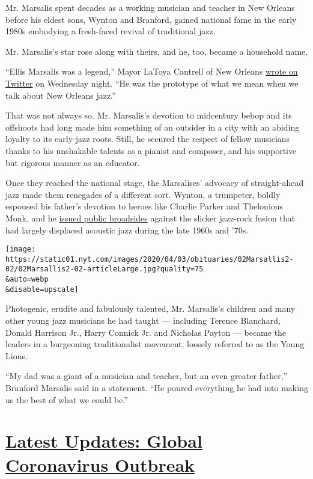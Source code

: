 Mr. Marsalis spent decades as a working musician and teacher in New
Orleans before his eldest sons, Wynton and Branford, gained national
fame in the early 1980s embodying a fresh-faced revival of traditional
jazz.

Mr. Marsalis's star rose along with theirs, and he, too, became a
household name.

``Ellis Marsalis was a legend,'' Mayor LaToya Cantrell of New Orleans
\href{https://twitter.com/mayorcantrell/status/1245523886810238979}{wrote
on Twitter} on Wednesday night. ``He was the prototype of what we mean
when we talk about New Orleans jazz.''

That was not always so. Mr. Marsalis's devotion to midcentury bebop and
its offshoots had long made him something of an outsider in a city with
an abiding loyalty to its early-jazz roots. Still, he secured the
respect of fellow musicians thanks to his unshakable talents as a
pianist and composer, and his supportive but rigorous manner as an
educator.

Once they reached the national stage, the Marsalises' advocacy of
straight-ahead jazz made them renegades of a different sort. Wynton, a
trumpeter, boldly espoused his father's devotion to heroes like Charlie
Parker and Thelonious Monk, and he
\href{https://www.nytimes.com/1988/07/31/arts/music-what-jazz-is-and-isn-t.html}{issued
public broadsides} against the slicker jazz-rock fusion that had largely
displaced acoustic jazz during the late 1960s and '70s.

\texttt{[image: https://static01.nyt.com/images/2020/04/03/obituaries/02Marsallis2-02/02Marsallis2-02-articleLarge.jpg?quality=75\\\&auto=webp\\\&disable=upscale]}

Photogenic, erudite and fabulously talented, Mr. Marsalis's children and
many other young jazz musicians he had taught --- including Terence
Blanchard, Donald Harrison Jr., Harry Connick Jr. and Nicholas Payton
--- became the leaders in a burgeoning traditionalist movement, loosely
referred to as the Young Lions.

``My dad was a giant of a musician and teacher, but an even greater
father,'' Branford Marsalis said in a statement. ``He poured everything
he had into making us the best of what we could be.''

\hypertarget{latest-updates-global-coronavirus-outbreak}{%
\section{\texorpdfstring{\href{https://www.nytimes.com/2020/08/03/world/coronavirus-covid-19.html?action=click\&pgtype=Article\&state=default\&region=MAIN_CONTENT_1\&context=storylines_live_updates}{Latest
Updates: Global Coronavirus
Outbreak}}{Latest Updates: Global Coronavirus Outbreak}}\label{latest-updates-global-coronavirus-outbreak}}

